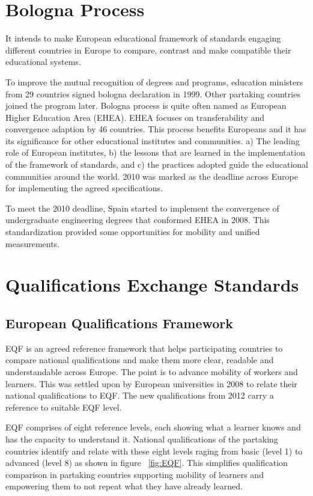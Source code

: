 \documentclass[12pt,a4paper,oneside]{book}
\begin{document}
\section{Bologna Process}

It intends to make European educational framework of standards engaging different countries in Europe to compare, contrast and make compatible their educational systems. \cite{bologna process}

To improve the mutual recognition of degrees and programs, education ministers from 29 countries signed bologna declaration in 1999. Other partaking countries joined the program later. \cite{improvement bologna process} Bologna process is quite often named as European Higher Education Area (EHEA). EHEA focuses on transferability and convergence adaption by 46 countries. This process benefits Europeans and it has its significance for other educational institutes and communities. a) The leading role of European institutes, b) the lessons that are learned in the implementation of the framework of standards, and c) the practices adopted guide the educational communities around the world. 2010 was marked as the deadline across Europe for implementing the agreed specifications. \cite{European Higher Education Area }

To meet the 2010 deadline, Spain started to implement the convergence of undergraduate engineering degrees that conformed EHEA in 2008. This standardization provided some opportunities for mobility and unified measurements. \cite{European Higher Education Area }




\section{Qualifications Exchange Standards}

    \subsection{European Qualifications Framework}
    EQF is an agreed reference framework that helps participating countries to compare national qualifications and make them more clear, readable and understandable across Europe. The point is to advance mobility of workers and learners. This was settled upon by European universities in 2008 to relate their national qualifications to EQF. The new qualifications from 2012 carry a reference to suitable EQF level.

    EQF comprises of eight reference levels, each showing what a learner knows and has the capacity to understand it. National qualifications of the partaking countries identify and relate with these eight levels raging from basic (level 1) to advanced (level 8) as shown in figure ~\ref{fig:EQF}. This simplifies qualification comparison in partaking countries supporting mobility of learners and empowering them to not repeat what they have already learned.
\end{document}
